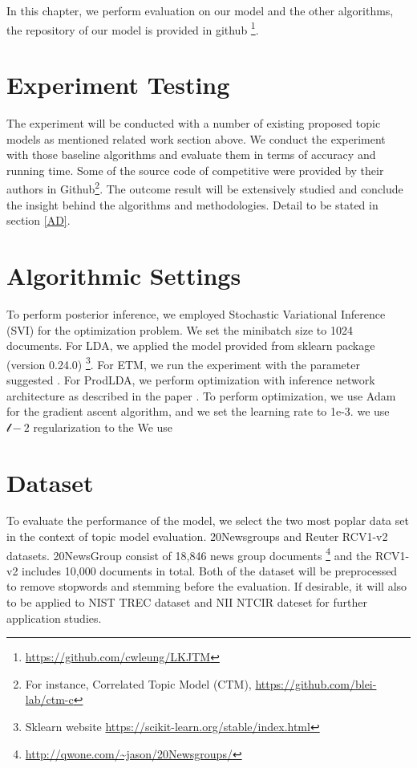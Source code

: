 In this chapter, we perform evaluation on our model and the other algorithms, the repository of our model is provided in github \footnote{\url{https://github.com/cwleung/LKJTM}}.
\section{Experiment Testing}
The experiment will be conducted with a number of existing proposed topic models as mentioned related work section above. We conduct the experiment with those baseline algorithms and evaluate them in terms of accuracy and running time. Some of the source code of competitive were provided by their authors in Github\footnote{For instance, Correlated Topic Model (CTM), \href{https://github.com/blei-lab/ctm-c}{https://github.com/blei-lab/ctm-c}}. The outcome result will be extensively studied and conclude the insight behind the algorithms and methodologies. Detail to be stated in section \ref{AD}.
\section{Algorithmic Settings}
To perform posterior inference, we employed Stochastic Variational Inference (SVI) \cite{hoffman_stochastic_2013} for the optimization problem. We set the minibatch size to 1024 documents.
For LDA, we applied the model provided from sklearn package (version 0.24.0) \footnote{Sklearn website \url{https://scikit-learn.org/stable/index.html}}. For ETM, we run the experiment with the parameter suggested \cite{dieng_topic_2019}. For ProdLDA, we perform optimization with inference network architecture as described in the paper \cite{srivastava_autoencoding_2017}. 
To perform optimization, we use Adam for the gradient ascent algorithm, and we set the learning rate to 1e-3.
we use $ \mathcal{l-2} $ regularization to the 
We use 

% 
\section{Dataset}To evaluate the performance of the model, we select the two most poplar data set in the context of topic model evaluation. 20Newsgroups and Reuter RCV1-v2 datasets. 20NewsGroup consist of 18,846 news group documents \footnote{\url{http://qwone.com/~jason/20Newsgroups/}} and the RCV1-v2 includes 10,000 documents in total. Both of the dataset will be preprocessed to remove stopwords and stemming before the evaluation. If desirable, it will also to be applied to NIST TREC dataset and NII NTCIR dateset for further application studies.
